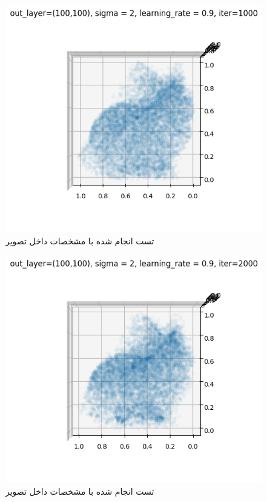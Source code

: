 \documentclass{article}
\begin{document}
\begin{figure}[!h]
    \centering\includegraphics[scale=.65]{./p1-2}
    \caption{تست انجام شده با مشخصات داخل تصویر}\label{fig.12}
\end{figure}


\begin{figure}[!h]
    \centering\includegraphics[scale=.65]{./p1-3}
    \caption{تست انجام شده با مشخصات داخل تصویر}\label{fig.13}
\end{figure}
\end{document}
